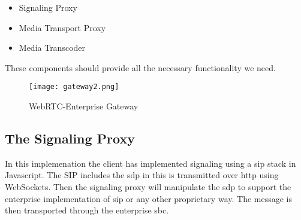 \begin{itemize}
\item{Signaling Proxy}
\item{Media Transport Proxy}
\item{Media Transcoder}
\end{itemize}

These components should provide all the necessary functionality we need.

\begin{figure}[here]
\centerline{\texttt{[image: gateway2.png]}}
\caption{WebRTC-Enterprise Gateway}
\label{fig:wrtc-enterprise-gateway}
\end{figure}

\subsection{The Signaling Proxy}
In this implemenation the client has implemented signaling using a \gls{sip} stack in Javascript. The SIP includes the \gls{sdp} in this is transmitted over \gls{http} using WebSockets. Then the signaling proxy will manipulate the \gls{sdp} to support the enterprise implementation of \gls{sip} or any other proprietary way. The message is then transported through the enterprise \gls{sbc}.







